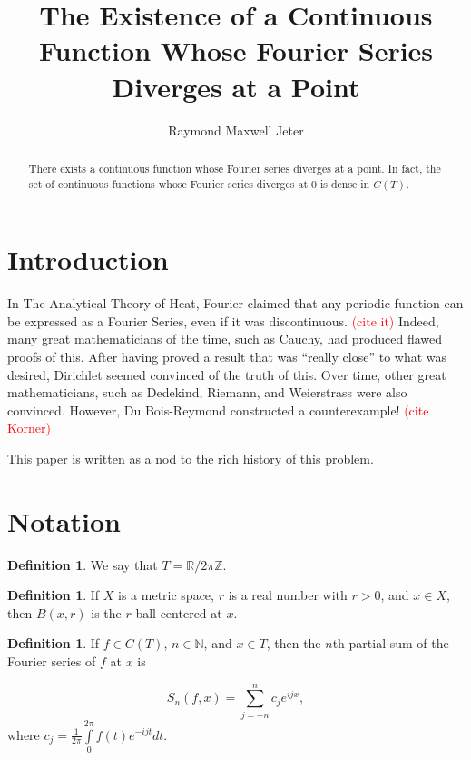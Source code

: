 \documentclass{amsart}
\newcommand{\N}{\mathbb{N}}
\newcommand{\R}{\mathbb{R}}
\newcommand{\Z}{\mathbb{Z}}
\newcommand{\colorcomment}[2]{\textcolor{#1}{#2}} %
\theoremstyle{definition}
\newtheorem{definition}[thm]{Definition}
\begin{document}
\title{The Existence of a Continuous Function Whose Fourier Series Diverges at a Point}
\author{Raymond Maxwell Jeter}

\begin{abstract}
There exists a continuous function whose Fourier series diverges at a point. 
In fact, the set of continuous functions whose Fourier series diverges at $0$ is dense in $C(T)$.
\end{abstract}

\maketitle

\section{Introduction}

In The Analytical Theory of Heat, Fourier claimed that any periodic function can be expressed as a Fourier Series, even if it was discontinuous. \colorcomment{red}{(cite it)}
Indeed, many great mathematicians of the time, such as Cauchy, had produced flawed proofs of this. 
After having proved a result that was ``really close'' to what was desired, Dirichlet seemed convinced of the truth of this. 
Over time, other great mathematicians, such as Dedekind, Riemann, and Weierstrass were also convinced. 
However, Du Bois-Reymond constructed a counterexample! \colorcomment{red}{(cite Korner)}

This paper is written as a nod to the rich history of this problem.

\section{Notation}

\begin{definition}
We say that $T = \R / 2\pi \Z$.
\end{definition}

\begin{definition}
If $X$ is a metric space, $r$ is a real number with $r>0$, and $x \in X$, then $B(x,r)$ is the $r$-ball centered at $x$.
\end{definition}

\begin{definition}
If $f \in C(T)$, $n \in \N$, and $x \in T$, then the $n$th partial sum of the Fourier series of $f$ at $x$ is 

\begin{displaymath}
S_n(f,x) = \sum\limits_{j=-n}^n c_j e^{ijx},
\end{displaymath}
where $c_j = \frac{1}{2 \pi} \int\limits_0^{2\pi} f(t)e^{-ijt} dt$.
\end{definition}
\end{document}
